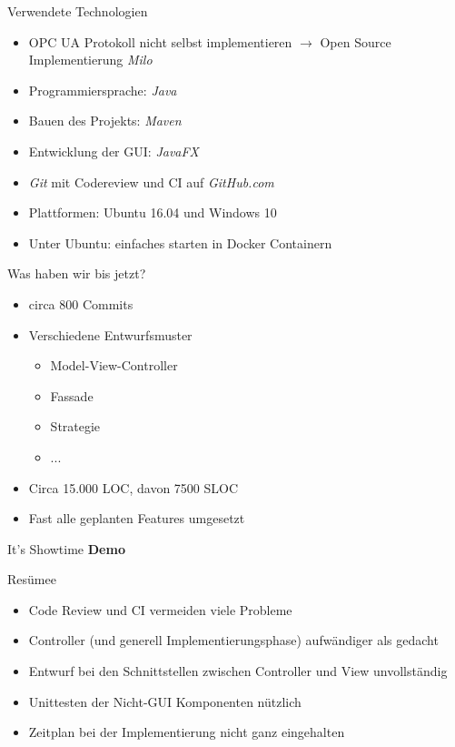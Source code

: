 \documentclass[22pt]{beamer}
\begin{document}
\begin{frame}{Verwendete Technologien}
\begin{itemize}[<+->]
 \item OPC UA Protokoll nicht selbst implementieren $\rightarrow$ Open Source Implementierung \emph{Milo}
 \item Programmiersprache: \emph{Java}
 \item Bauen des Projekts: \emph{Maven}
 \item Entwicklung der GUI: \emph{JavaFX}
 \item \emph{Git} mit Codereview und CI auf \emph{GitHub.com}
 \item Plattformen: Ubuntu 16.04 und Windows 10
 \item Unter Ubuntu: einfaches starten in Docker Containern
\end{itemize}
\end{frame}

\begin{frame}{Was haben wir bis jetzt?}
\begin{itemize}[<+->]
 \item circa 800 Commits
 \item Verschiedene Entwurfsmuster
 \begin{itemize}
  \item Model-View-Controller
  \item Fassade
  \item Strategie
  \item ...
 \end{itemize}
 \item Circa 15.000 LOC, davon 7500 SLOC
 \item Fast alle geplanten Features umgesetzt
\end{itemize}
\end{frame}

\begin{frame}{It's Showtime}
\centering
\huge
\textbf{Demo}
\end{frame}

\begin{frame}{Resümee}
\begin{itemize}[<+->]
 \item Code Review und CI vermeiden viele Probleme
 \item Controller (und generell Implementierungsphase) aufwändiger als gedacht
 \item Entwurf bei den Schnittstellen zwischen Controller und View unvollständig
 \item Unittesten der Nicht-GUI Komponenten nützlich
 \item Zeitplan bei der Implementierung nicht ganz eingehalten
\end{itemize}
\end{frame}
\end{document}

